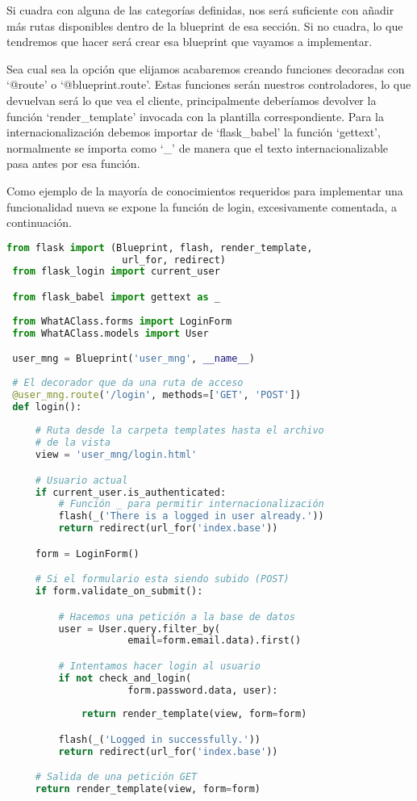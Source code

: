 Si cuadra con alguna de las categorías definidas, nos será suficiente con añadir más rutas disponibles dentro de la blueprint de esa sección. Si no cuadra, lo que tendremos que hacer será crear esa blueprint que vayamos a implementar. 

Sea cual sea la opción que elijamos acabaremos creando funciones decoradas con `@route' o `@blueprint.route'. Estas funciones serán nuestros controladores, lo que devuelvan será lo que vea el cliente, principalmente deberíamos devolver la función `render\_template' invocada con la plantilla correspondiente. Para la internacionalización debemos importar de `flask\_babel' la función `gettext', normalmente se importa como `\_' de manera que el texto internacionalizable pasa antes por esa función.

Como ejemplo de la mayoría de conocimientos requeridos para implementar una funcionalidad nueva se expone la función de login, excesivamente comentada, a continuación.

\lstset{style=blockstyle}
\begin{lstlisting}[language=Python]
 from flask import (Blueprint, flash, render_template, 
                    url_for, redirect)
 from flask_login import current_user

 from flask_babel import gettext as _
 
 from WhatAClass.forms import LoginForm 
 from WhatAClass.models import User

 user_mng = Blueprint('user_mng', __name__)
 
 # El decorador que da una ruta de acceso
 @user_mng.route('/login', methods=['GET', 'POST'])
 def login():
 
     # Ruta desde la carpeta templates hasta el archivo
     # de la vista     
     view = 'user_mng/login.html'

     # Usuario actual
     if current_user.is_authenticated:
         # Función _ para permitir internacionalización
         flash(_('There is a logged in user already.'))
         return redirect(url_for('index.base'))

     form = LoginForm()

     # Si el formulario esta siendo subido (POST)
     if form.validate_on_submit():

         # Hacemos una petición a la base de datos
         user = User.query.filter_by(
                     email=form.email.data).first()

         # Intentamos hacer login al usuario
         if not check_and_login(
                     form.password.data, user):
                     
             return render_template(view, form=form)

         flash(_('Logged in successfully.'))
         return redirect(url_for('index.base'))

     # Salida de una petición GET
     return render_template(view, form=form)
\end{lstlisting}

